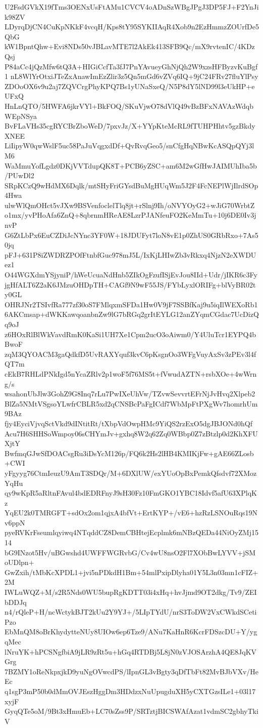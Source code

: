 U2FsdGVkX19fTms3OENxUsFtAMu1CVCV4oADnSzWBgJPgJ3DP5FJ+F2YnJik98ZV
LDyrqDjCN4CuKpNKkF4vcqH/Kps8tY95SYKIIAqR4Xob9n2EzHmmzZOUrfDe5QbG
kW1BpntQhw+Evi8NDs50vJBLavMTE7l2AkEk413SFB9Qc/mX9rvtenIC/4KDzQsj
P84aCc4jQzMfw6tQ3A+HIGiCcfTa3fJ7PnYAvueyGhNjQh2W9xzsHFByzvKuBgf1
nL8WlYrOtxiJTeZxAnawImEzZlir3z5Qn5mGd6vZVq6IQ+9jC24FRv27fluYlPsy
ZDOoOX6v9u2aj7ZQVCrgPhyKPQ7Bs1yUNaSxeQ/N5P8dY5lND99l3eUkHP+eUFxQ
HnLnQTO/5HWFA6jkrVYl+BkFOQ/SKuVjwO78dVlQ49vBzBFxNAVAzWdqbWEpNSya
BvFLaVHs35cgRYCBrZboWeD/7pxvJz/X+YYpKteMcRL9fTUHPHhtv5gzBkdyXNEE
LiIipyW0qwWslF5uc58PaJuVqgxdDf+QvRvqGeo5/snCfgHqNBwKcASQpQYj3lM6
WaMmuYofLgdz0DKjVVTdupQK8T+PCB6yZSC+am6M2wGfHwJAIMUhIba5b/PUwDl2
SRpKCzQ9wHdMX6Dqlk/mtSHyFriGYsdBuMgHUqWm5J2F4FcNEPlWjIlrdSOp4Hwa
ulwWlQmOHct5vJXw9BSVenfoclelTlq8jt+rSlnj9Ih/oNVYOyG2+wJiG70WrbtZ
o1mx/yvPHoAfa6ZnQ+8qbrnmHReAE8LzrPJANfeuFO2KeMmTu+10j6DE0Iv3jnvP
G6ZtLbPx6EuCZDiJcNYnc3YF0W+18JDUFyt7loN8vE1p0ZhUS0GRbRxo+7As50jq
pFJ+631P8iZWDRZPOfFtnbfGuc978mJ5L/IxKjLHIwZb3vRkxq4NjzN2eXWDUez1
O44WGXdmYSjyniP/hWeUcuaNdHnb5ZIkOgFzufISjEvJou8IId+Udr/jIKR6c3Fy
jgHfALT6Z2aK6JMzuOHDpTH+CAGf9N9wF55JS/FYbLyxlORIFg+blVyBR02ty0GL
OHRJNr2TSIvfRa777zf30oS7FMlqxmSFDa1Hw0V9jF7SSBfKaj9u5iqIlWEXoRb1
6AKCmsap+dWKKawqoanbnZw9lG7bRGq2grItEYLG12anZYqmCGdac7UcDizQq9oJ
z6HOxRlBlWkVavdRmK0KaSi1UH7Xe1Cpm2ucO3oAiwm0/Y4UluTcr1EYPQ4bBwoF
zqM3QYOACM3gaQdkfD5UvRAXYquf3kvC6pKsgnOo3WFgVuyAxSv3zPEv3l4fQT7m
cEkB7RHLdPNkIgd5nYcaZRlv2p1woF5f76MS5t+fVwudAZTN+rsbXOe+4wWrng/s
wsahonUbJlw3GohZ9G8Inq7rLu7PwIXeUhVw/TZvwSevvrtEFrNjJvHvq2Xlpeb2
BlZa5NMtVSgsoYLwfrCBLR5xd2qCNSBcPaFgICdf7WbMpFtPXgWv7homrhUm9BAz
fjy4EyciVjvqSctVkd9dINtitRt/tXbpVdOwpHMc9YiQS2rzExO5dgJBJONd0hQf
Acu7H6SHHSoWmpoy06sCHYmJv+gxhq8W2q62Zq0WBbp0Z7zBtzlp0d2KhXFUXjtY
BwfmqGJwSfDOACsgRu3iDsYcM126p/FQ6k2Hs2lHB4KMIKjFw+gAE66ZLosb+CWI
yFgyyg76CtmIeuzU9AmT3SDQr/M+6DXlUW/exYUoOpBxPemkQfsdvf72XMozYqHu
qy9wKpR5aRltnFAvul4bdEDRFnyJ9sH30Fz10FmGKO1YBC18Idvf5afU63XPlqKz
YqEU2k0TMRGFT+sdOx2om1qjxA4bfVt+ErtKYP+/vE6+hzRzLSNOuRqs19Nv6ppN
pyeRVKrFseumlqyiwq4NTqddCZ8DemCBHtejEcplmk6mNBzQEDa44NiOyZMj1514
bG9INzot5Hv/uBGwshd4UWFFWGRvbG/Cv4wU8nsO2Fl7XObBwLYVV+jSMoUDlpn+
GwZxih/tMbKcXPDL1+jvi5nPDkdH1Bm+54mlPxipDlyha01Y5L3n03mn1cFIZ+2M
IWLuWQZ+M/s2R5Nds0WU5bupRgKDTT03i4xHq+hvJjmd9OT2dkg/Tv9/ZEIbDDJq
n4/rQleP+H/ncWctykBJT2kUu2Y9YJ+/5LIpTYdU/nrS3ToDW2VxCWkdSCetiPzo
EbMnQM8oBrKhydytteNUy8UIOw6ep6Tze9/ANu7KaHnR6KcrFDSzcDU+Y/ygqMec
lNruYK+hPCSNgfbiA9jLR9zRt5u+hGq4RTDBj5L8jN0zVJOSArzhA4QE8JqKVGrg
7BZMY1oReNkpxjkD9yuNgOVwcdPS/lIpnGL3vBgty3qDfTbFt82MvBJbVXv/HeEc
q1sgP3mP50b0dMmOVJEszHggDm3HDdzxNuUpugduXH5yCXTGzsILe1+03l17xyjF
GyqQTe5oM/9Bt3xHmuEb+LC70sZss9P/SRTztjBICSWAfAzat1vdmSC2gbhyTkiV
